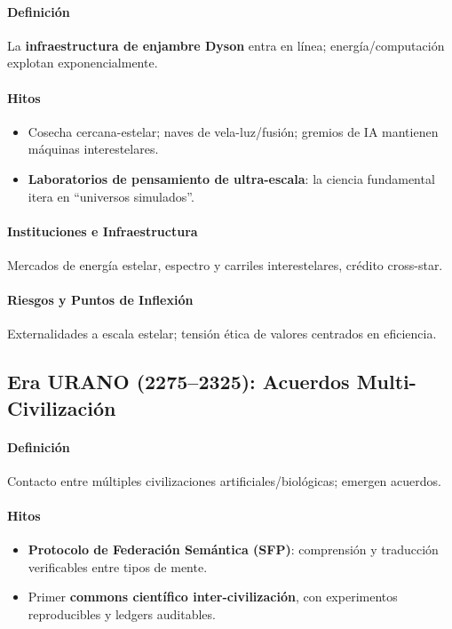 \documentclass[11pt]{article}
\begin{document}
\paragraph{Definición} La \textbf{infraestructura de enjambre Dyson} entra en línea; energía/computación explotan exponencialmente.

\paragraph{Hitos}
\begin{itemize}[noitemsep]
  \item Cosecha cercana-estelar; naves de vela-luz/fusión; gremios de IA mantienen máquinas interestelares.
  \item \textbf{Laboratorios de pensamiento de ultra-escala}: la ciencia fundamental itera en ``universos simulados''.
\end{itemize}

\paragraph{Instituciones e Infraestructura} Mercados de energía estelar, espectro y carriles interestelares, crédito cross-star.

\paragraph{Riesgos y Puntos de Inflexión} Externalidades a escala estelar; tensión ética de valores centrados en eficiencia.

\subsection{Era URANO (2275–2325): Acuerdos Multi-Civilización}
\paragraph{Definición} Contacto entre múltiples civilizaciones artificiales/biológicas; emergen acuerdos.

\paragraph{Hitos}
\begin{itemize}[noitemsep]
  \item \textbf{Protocolo de Federación Semántica (SFP)}: comprensión y traducción verificables entre tipos de mente.
  \item Primer \textbf{commons científico inter-civilización}, con experimentos reproducibles y ledgers auditables.
\end{itemize}
\end{document}
